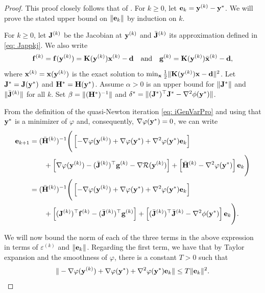 \documentclass[onefignum,onetabnum]{siamart171218}
\newcommand{\bH}{{\bf H}}
\newcommand{\bJ}{{\bf J}}
\newcommand{\bK}{{\bf K}}
\newcommand{\bd}{{\bf d}}
\newcommand{\be}{{\bf e}}
\newcommand{\bff}{{\bf f}}
\newcommand{\bg}{{\bf g}}
\newcommand{\bx}{{\bf x}}
\newcommand{\by}{{\bf y}}
\begin{document}
\begin{proof}
This proof closely follows that of \cite[Theorem 3.3]{espanol2025local}. For $k\ge 0$, let $\be_k = \by^{(k)}- \by^*$. We will prove the stated upper bound on $\|\be_k\|$ by induction on $k$.

For $k\ge 0$, let $\bJ^{(k)}$ be the Jacobian at $\by^{(k)}$ and $\bar \bJ^{(k)}$ its approximation defined in \eqref{eq: Jappkj}. We also write
$$\bff^{(k)} = \bff(\by^{(k)}) = \bK(\by^{(k)}) \bx^{(k)} - \bd 
\quad \mbox{and} \quad 
\bg^{(k)} = \bK(\by^{(k)}) \bar \bx^{(k)} -\bd,$$
where $\bx^{(k)}=\bx(\by^{(k)})$ is the exact solution to  $\min_{\bx} \frac{1}{2}\|\bK(\by^{(k)})\bx - \bd\|^2$.
Let $\bJ^\ast=\bJ(\by^\ast)$ and $\bH^\ast=\bH(\by^*)$. Assume $\alpha>0$ is an upper bound for $\|\bJ^\ast\|$ and $\| \bar\bJ^{(k)}\|$ for all $k$. 
Set $\beta= \|(\bH^\ast)^{-1}\|$ and $\delta^\ast= \| (\bJ^\ast)^\top \bJ^\ast- \nabla^2 \phi (\by^\ast) \|$.

From the definition of the quasi-Newton iteration \eqref{eq: iGenVarPro} and using that $\by^*$ is a minimizer of $\varphi$ and, consequently,  $\nabla \varphi (\by^\ast)=0$, we can write
\begin{align}\label{eq:error_expression}
\be_{k+1} &= (\bar\bH^{(k)})^{-1}\Bigg( 
    \left[ -\nabla\varphi(\by^{(k)}) + \nabla \varphi (\by^\ast) + \nabla^2 \varphi(\by^\ast) \be_{k} \right] \nonumber\\
&\qquad + \left[ \nabla \varphi(\by^{(k)}) - (\bar\bJ^{(k)})^\top \bg^{(k)} - \nabla\mathcal{R}(\by^{(k)}) \right] + \left[\bar\bH^{(k)} - \nabla^2 \varphi(\by^\ast) \right] \be_{k} \Bigg) \nonumber\\
&=  (\bar\bH^{(k)})^{-1}\Bigg( \left[ -\nabla\varphi(\by^{(k)}) + \nabla \varphi (\by^\ast) + \nabla^2 \varphi(\by^\ast) \be_{k} \right] \nonumber\\
&\qquad + \left[ (\bJ^{(k)})^\top \bff^{(k)} - (\bar\bJ^{(k)})^\top \bg^{(k)} \right] + \left[(\bar\bJ^{(k)})^\top\bar\bJ^{(k)} - \nabla^2 \phi(\by^\ast) \right] \be_{k} \Bigg).
\end{align}

We will now bound the norm of each of the three terms in the above expression in terms of $\varepsilon^{(k)}$ and $\| \be_{k}\|$.
Regarding the first term, we have that by Taylor expansion and the smoothness of $\varphi$, there is a constant $T>0$ such that
\begin{equation}\label{eq:taylor}
\|-\nabla \varphi (\by^{(k)}) + \nabla \varphi (\by^\ast) + \nabla^2 \varphi(\by^\ast) \be_{k}\| \le T \| \be_{k}\|^2.
\end{equation}


\end{proof}
\end{document}
